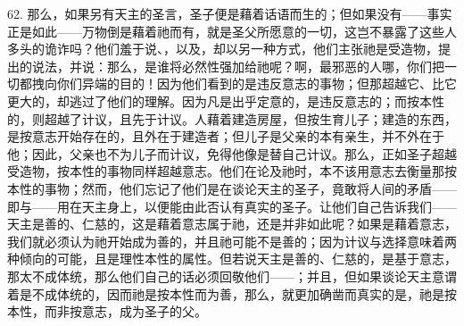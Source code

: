 62. 那么，如果另有天主的圣言，圣子便是藉着话语而生的；但如果没有——事实正是如此——万物倒是藉着祂而有，就是圣父所愿意的一切，这岂不暴露了这些人多头的诡诈吗？他们羞于说、，以及，却以另一种方式，他们主张祂是受造物，提出的说法，并说：那么，是谁将必然性强加给祂呢？啊，最邪恶的人哪，你们把一切都拽向你们异端的目的！因为他们看到的是违反意志的事物；但那超越它、比它更大的，却逃过了他们的理解。因为凡是出乎定意的，是违反意志的；而按本性的，则超越了计议，且先于计议。人藉着建造房屋，但按生育儿子；建造的东西，是按意志开始存在的，且外在于建造者；但儿子是父亲的本有亲生，并不外在于他；因此，父亲也不为儿子而计议，免得他像是替自己计议。那么，正如圣子超越受造物，按本性的事物同样超越意志。他们在论及祂时，本不该用意志去衡量那按本性的事物；然而，他们忘记了他们是在谈论天主的圣子，竟敢将人间的矛盾——即与——用在天主身上，以便能由此否认有真实的圣子。让他们自己告诉我们——天主是善的、仁慈的，这是藉着意志属于祂，还是并非如此呢？如果是藉着意志，我们就必须认为祂开始成为善的，并且祂可能不是善的；因为计议与选择意味着两种倾向的可能，且是理性本性的属性。但若说天主是善的、仁慈的，是基于意志，那太不成体统，那么他们自己的话必须回敬他们——；并且，但如果谈论天主意谓着是不成体统的，因而祂是按本性而为善，那么，就更加确凿而真实的是，祂是按本性，而非按意志，成为圣子的父。\par

